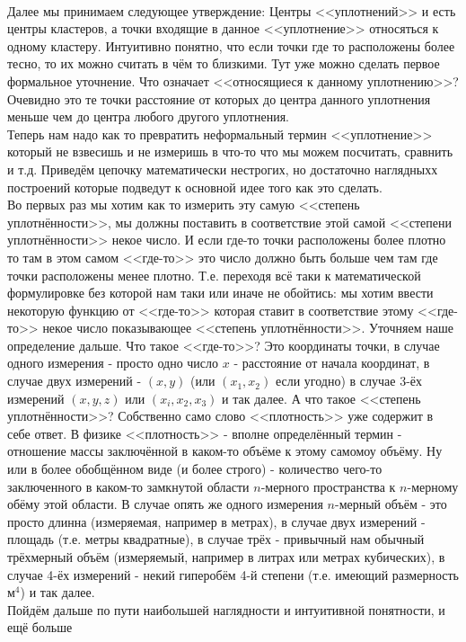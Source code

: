 \documentclass[11pt]{article}
\begin{document}
    \\ Далее мы принимаем следующее утверждение: Центры
<<уплотнений>> и есть центры кластеров, а точки входящие в данное
<<уплотнение>> относяться к одному кластеру. Интуитивно понятно,
что если точки где то расположены более тесно, то их можно считать в чём
то близкими. Тут уже можно сделать первое формальное уточнение. Что
означает <<относящиеся к данному уплотнению>>? Очевидно это те
точки расстояние от которых до центра данного уплотнения меньше чем до
центра любого другого уплотнения. \\ Теперь нам надо как то
превратить неформальный термин <<уплотнение>> который не взвесишь и
не измеришь в что-то что мы можем посчитать, сравнить и т.д. Приведём
цепочку математически нестрогих, но достаточно наглядныхх построений
которые подведут к основной идее того как это сделать.
\\ Во первых раз мы хотим как то измерить эту самую
<<степень уплотнённости>>, мы должны поставить в соответствие этой
самой <<степени уплотнённости>> некое число. И если где-то точки
расположены более плотно то там в этом самом <<где-то>> это число
должно быть больше чем там где точки расположены менее плотно. Т.е.
переходя всё таки к математической формулировке без которой нам таки или
иначе не обойтись: мы хотим ввести некоторую функцию от <<где-то>>
которая ставит в соответствие этому <<где-то>> некое число
показывающее <<степень уплотнённости>>. Уточняем наше определение
дальше. Что такое <<где-то>>? Это координаты точки, в случае одного
измерения - просто одно число $x$ - расстояние от начала координат, в
случае двух измерений - $(x, y)$ (или $(x_1, x_2)$ если угодно) в случае
3-ёх измерений $(x, y, z)$ или $(x_i, x_2, x_3)$ и так далее. А что
такое <<степень уплотнённости>>? Собственно само слово
<<плотность>> уже содержит в себе ответ. В физике
<<плотность>> - вполне определённый термин - отношение массы
заключённой в каком-то объёме к этому самомоу объёму. Ну или в более
обобщённом виде (и более строго) - количество чего-то заключенного в
каком-то замкнутой области $n$-мерного пространства к $n$-мерному обёму
этой области. В случае опять же одного измерения $n$-мерный объём - это
просто длинна (измеряемая, например в метрах), в случае двух измерений -
площадь (т.е. метры квадратные), в случае трёх - привычный нам обычный
трёхмерный объём (измеряемый, например в литрах или метрах кубических),
в случае 4-ёх измерений - некий гиперобём 4-й степени (т.е. имеющий
размерность ${\mbox{м}}^4$) и так далее. \\ Пойдём дальше
по пути наибольшей наглядности и интуитивной понятности, и ещё больше
\end{document}
